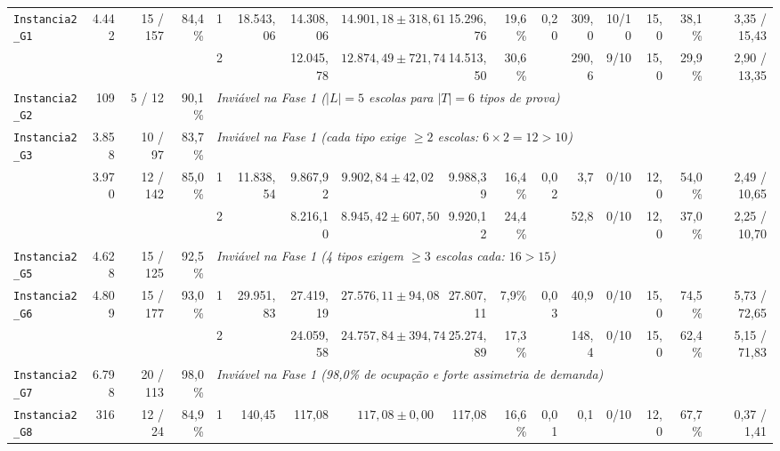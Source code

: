 {\begin{longtable}{lrrrcrrrrrrrrrrr}
\midrule
\multirow{2}{*}{\texttt{Instancia2\_G1}} & \multirow{2}{*}{4.442} & \multirow{2}{*}{15 / 157} & \multirow{2}{*}{84,4\%} & 1 & \multirow{2}{*}{18.543,06} & 14.308,06 & $14.901,18 \pm 318,61$ & 15.296,76 & 19,6\% & \multirow{2}{*}{0,20} & 309,0 & 10/10 & 15,0 & 38,1\% & 3,35 / 15,43 \\
& & & & 2 &  & 12.045,78 & $12.874,49 \pm 721,74$ & 14.513,50 & 30,6\% &  & 290,6 & 9/10 & 15,0 & 29,9\% & 2,90 / 13,35 \\
\midrule
\texttt{Instancia2\_G2} & 109 & 5 / 12 & 90,1\% & \multicolumn{12}{l}{\textit{Inviável na Fase 1 ($|L|=5$ escolas para $|T|=6$ tipos de prova)}} \\
\midrule
\texttt{Instancia2\_G3} & 3.858 & 10 / 97 & 83,7\% & \multicolumn{12}{l}{\textit{Inviável na Fase 1 (cada tipo exige $\ge 2$ escolas: $6 \times 2 = 12 > 10$)}} \\
\midrule
\rowcolor{gray!18}\multirow{2}{*}{\textbf{\texttt{Instancia2\_G4}}} & \multirow{2}{*}{3.970} & \multirow{2}{*}{12 / 142} & \multirow{2}{*}{85,0\%} & 1 & \multirow{2}{*}{11.838,54} & 9.867,92 & $9.902,84 \pm 42,02$ & 9.988,39 & 16,4\% & \multirow{2}{*}{0,02} & 3,7 & 0/10 & 12,0 & 54,0\% & 2,49 / 10,65 \\
\rowcolor{gray!18}& & & & 2 &  & 8.216,10 & $8.945,42 \pm 607,50$ & 9.920,12 & 24,4\% &  & 52,8 & 0/10 & 12,0 & 37,0\% & 2,25 / 10,70 \\
\midrule
\texttt{Instancia2\_G5} & 4.628 & 15 / 125 & 92,5\% & \multicolumn{12}{l}{\textit{Inviável na Fase 1 (4 tipos exigem $\ge 3$ escolas cada: $16 > 15$)}} \\
\midrule
\multirow{2}{*}{\texttt{Instancia2\_G6}} & \multirow{2}{*}{4.809} & \multirow{2}{*}{15 / 177} & \multirow{2}{*}{93,0\%} & 1 & \multirow{2}{*}{29.951,83} & 27.419,19 & $27.576,11 \pm 94,08$ & 27.807,11 & 7,9\% & \multirow{2}{*}{0,03} & 40,9 & 0/10 & 15,0 & 74,5\% & 5,73 / 72,65 \\
& & & & 2 &  & 24.059,58 & $24.757,84 \pm 394,74$ & 25.274,89 & 17,3\% &  & 148,4 & 0/10 & 15,0 & 62,4\% & 5,15 / 71,83 \\
\midrule
\texttt{Instancia2\_G7} & 6.798 & 20 / 113 & 98,0\% & \multicolumn{12}{l}{\textit{Inviável na Fase 1 (98,0\% de ocupação e forte assimetria de demanda)}} \\
\midrule
\multirow{2}{*}{\texttt{Instancia2\_G8}} & \multirow{2}{*}{316} & \multirow{2}{*}{12 / 24} & \multirow{2}{*}{84,9\%} & 1 & \multirow{2}{*}{140,45} & 117,08 & $117,08 \pm 0,00$ & 117,08 & 16,6\% & \multirow{2}{*}{0,01} & 0,1 & 0/10 & 12,0 & 67,7\% & 0,37 / 1,41 \\

\end{longtable}}
